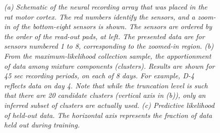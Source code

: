 \documentclass[journal]{IEEEtran}
\begin{document}
\begin{figure}[!htbp]
{ }
  \caption{\small \emph{(a) Schematic of the neural
recording array that was placed in the rat motor cortex. The red
numbers identify the sensors, and a zoom-in of the bottom-eight
sensors is shown. The sensors are ordered by the order of the
read-out pads, at left. The presented data are for sensors numbered 1 to 8, corresponding to the zoomed-in region. (b) From the maximum-likelihood collection
sample, the apportionment of data among mixture components
(clusters). Results are shown for 45 sec recording periods, on each
of 8 days. For example, D-4 reflects data on day 4. Note that while the truncation level is such that there are 20 candidate clusters (vertical axis in (b)), only an inferred subset of clusters are actually used. (c) Predictive likelihood of held-out data. The
horizontal axis represents the fraction of data held out during training.}}
\end{figure}
\end{document}
